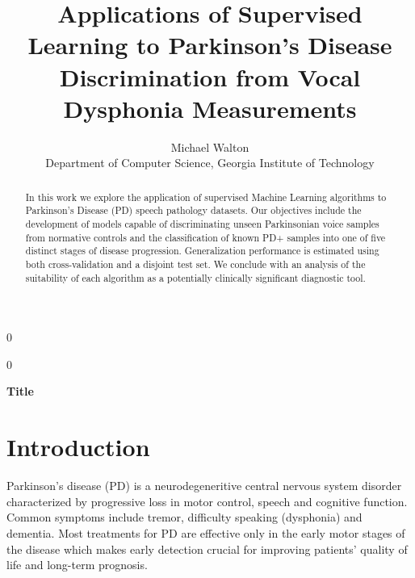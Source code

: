 \documentclass[12pt]{article}
\newcommand{\blind}{0}
\begin{document}
%

\def\spacingset#1{\renewcommand{\baselinestretch}%
{#1}\small\normalsize} \spacingset{1}



\blind
{
  \title{\bf Applications of Supervised Learning to Parkinson's Disease Discrimination from Vocal Dysphonia Measurements}
  \author{Michael Walton\\
    Department of Computer Science, Georgia Institute of Technology\\}
  \maketitle
} \fi

\blind
{
  \bigskip
  \bigskip
  \bigskip
  \begin{center}
    {\LARGE\bf Title}
\end{center}
  \medskip
} \fi

\begin{abstract}
In this work we explore the application of supervised Machine Learning algorithms to Parkinson's Disease (PD) speech pathology datasets. Our objectives include the development of models capable of discriminating unseen Parkinsonian voice samples from normative controls and the classification of known PD+ samples into one of five distinct stages of disease progression. Generalization performance is estimated using both cross-validation and a disjoint test set. We conclude with an analysis of the suitability of each algorithm as a potentially clinically significant diagnostic tool.
\end{abstract}

\spacingset{1.45}
\section{Introduction}
\label{sec:intro}

Parkinson's disease (PD) is a neurodegeneritive central nervous system disorder characterized by progressive loss in motor control, speech and cognitive function. Common symptoms include tremor, difficulty speaking (dysphonia) and dementia. Most treatments for PD are effective only in the early motor stages of the disease which makes early detection crucial for improving patients' quality of life and long-term prognosis.
\end{document}
